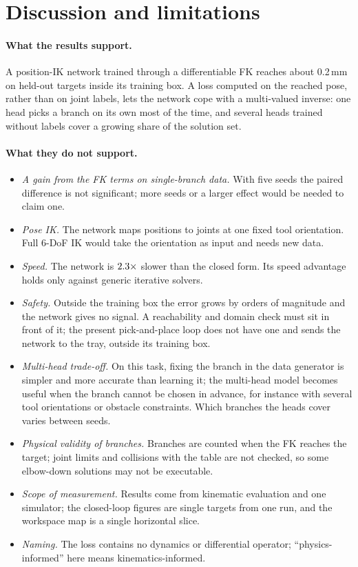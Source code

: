 \documentclass[11pt]{article}
\begin{document}
\section{Discussion and limitations}
\paragraph{What the results support.}
A position-IK network trained through a differentiable FK reaches about
0.2\,mm on held-out targets inside its training box. A loss computed on the reached
pose, rather than on joint labels, lets the network cope with a multi-valued
inverse: one head picks a branch on its own most of the time, and several
heads trained without labels cover a growing share of the solution set.

\paragraph{What they do not support.}
\begin{itemize}
\item \emph{A gain from the FK terms on single-branch data.} With five seeds the
  paired difference is not significant; more seeds or a larger effect would be
  needed to claim one.
\item \emph{Pose IK.} The network maps positions to joints at one fixed tool
  orientation. Full 6-DoF IK would take the orientation as input and needs new
  data.
\item \emph{Speed.} The network is $2.3\times$ slower than the closed
  form. Its speed advantage holds only against generic iterative solvers.
\item \emph{Safety.} Outside the training box the error grows by orders of
  magnitude and the network gives no signal. A reachability and domain check
  must sit in front of it; the present pick-and-place loop does not have one
  and sends the network to the tray, outside its training box.
\item \emph{Multi-head trade-off.} On this task, fixing the branch in the data
  generator is simpler and more accurate than learning it; the multi-head
  model becomes useful when the branch cannot be chosen in advance, for
  instance with several tool orientations or obstacle constraints. Which
  branches the heads cover varies between seeds.
\item \emph{Physical validity of branches.} Branches are counted when the FK
  reaches the target; joint limits and collisions with the table are not
  checked, so some elbow-down solutions may not be executable.
\item \emph{Scope of measurement.} Results come from kinematic evaluation and
  one simulator; the closed-loop figures are single targets from one run, and
  the workspace map is a single horizontal slice.
\item \emph{Naming.} The loss contains no dynamics or differential operator;
  ``physics-informed'' here means kinematics-informed.
\end{itemize}
\end{document}
